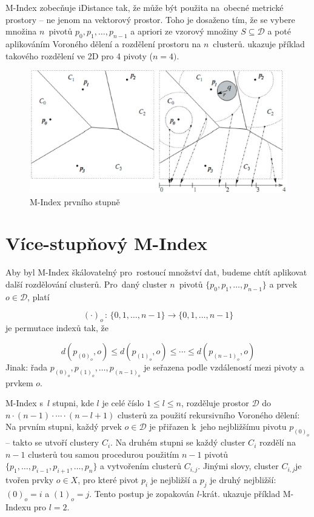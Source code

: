 M-Index zobecňuje iDistance tak, že může být použita na~obecné metrické
prostory -- ne jenom na vektorový prostor\@. Toho je dosaženo tím,
že se vybere množina $n$~pivotů $p_{0},p_{1},\ldots,p_{n-1}$ a
apriori ze vzorový množiny $S\subseteq\mathcal{D}$ a poté aplikováním
Voroného dělení a rozdělení prostoru na $n$~clusterů.  ukazuje
příklad takového rozdělení ve 2D pro 4 pivoty ($n=4)$.

\begin{figure}[t]
\begin{centering}
\includegraphics[scale=0.5]{m-index-level-one}\caption{M-Index prvního stupně\label{fig:M-Index-level-one}}

\par\end{centering}

\end{figure}



\section{Více-stupňový M-Index}

Aby byl M-Index škálovatelný pro~rostoucí množství dat, budeme chtít
aplikovat další rozdělování clusterů. Pro~daný cluster $n$~pivotů
$\{p_{0},p_{1},\ldots,p_{n-1}\}$ a prvek $o\in\mathcal{D}$, platí

\[
(\cdot)_{o}\,:\,\{0,1,\ldots,n-1\}\rightarrow\{0,1,\ldots,n-1\}
\]
je permutace indexů tak, že

\[
d(p_{(0)_{o}},o)\leq d(p_{(1)_{o}},o)\leq\cdots\leq d(p_{(n-1)_{o}},o)
\]
Jinak: řada $p_{(0)_{o}},p_{(1)_{o}},\ldots,p_{(n-1)_{o}}$ je seřazena
podle vzdáleností mezi pivoty a prvkem $o$\@.

M-Index s~$l$ stupni, kde $l$ je celé číslo $1\leq l\leq n$, rozděluje
prostor $\mathcal{D}$ do $n\cdot(n-1)\cdot\cdots\cdot(n-l+1)$ clusterů
za použití rekursivního Voroného dělení: Na prvním stupni, každý
prvek $o\in\mathcal{D}$ je přiřazen k~jeho nejbližšímu pivotu $p_{(0)_{o}}$--
takto se utvoří clustery $C_{i}$\@. Na druhém stupni se každý cluster
$C_{i}$ rozdělí na $n-1$ clusterů tou samou procedurou použitím
$n-1$ pivotů $\{p_{1},\ldots,p_{i-1},p_{i+1},\ldots,p_{n}\}$ a vytvořením
clusterů $C_{i,j}$\@. Jinými slovy, cluster $C_{i,j}$je tvořen
prvky $o\in X$, pro které pivot $p_{i}$ je nejbližší a $p_{j}$
je druhý nejbližší: $(0)_{o}=i$ a $(1)_{o}=j$\@. Tento postup je
zopakován $l$-krát\@.  ukazuje
příklad M-Indexu pro $l=2$\@.

